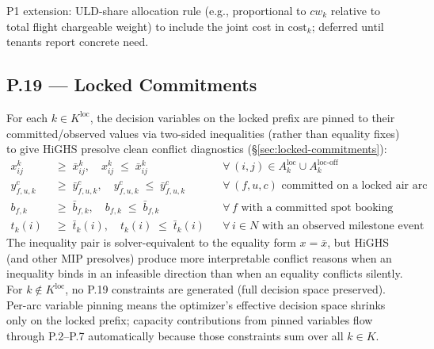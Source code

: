 \documentclass[11pt,a4paper]{article}
\theoremstyle{definition}
\begin{document}
P1 extension: ULD-share allocation rule (e.g., proportional to $cw_k$ relative to
total flight chargeable weight) to include the joint cost in $\text{cost}_k$;
deferred until tenants report concrete need.

\subsection*{P.19 — Locked Commitments}

For each $k \in K^{\text{loc}}$, the decision variables on the locked prefix are pinned
to their committed/observed values via two-sided inequalities (rather than equality
fixes) to give HiGHS presolve clean conflict diagnostics
(\S\ref{sec:locked-commitments}):
\begin{align}
  x_{ij}^k \;&\geq\; \bar{x}_{ij}^k,\quad x_{ij}^k \;\leq\; \bar{x}_{ij}^k
                                    & & \forall\, (i,j) \in A_k^{\text{loc}} \cup A_k^{\text{loc-off}} \\
  y_{f,u,k}^c \;&\geq\; \bar{y}_{f,u,k}^c,\quad y_{f,u,k}^c \;\leq\; \bar{y}_{f,u,k}^c
                                    & & \forall\, (f,u,c) \text{ committed on a locked air arc} \\
  b_{f,k} \;&\geq\; \bar{b}_{f,k},\quad b_{f,k} \;\leq\; \bar{b}_{f,k}
                                    & & \forall\, f \text{ with a committed spot booking} \\
  t_k(i) \;&\geq\; \bar{t}_k(i),\quad t_k(i) \;\leq\; \bar{t}_k(i)
                                    & & \forall\, i \in N \text{ with an observed milestone event}
  \label{eq:P19}
\end{align}
The inequality pair is solver-equivalent to the equality form $x = \bar{x}$, but
HiGHS (and other MIP presolves) produce more interpretable conflict reasons when an
inequality binds in an infeasible direction than when an equality conflicts silently.
For $k \notin K^{\text{loc}}$, no P.19 constraints are generated (full decision space
preserved). Per-arc variable pinning means the optimizer's effective decision space
shrinks only on the locked prefix; capacity contributions from pinned variables flow
through P.2--P.7 automatically because those constraints sum over all $k \in K$.
\end{document}
